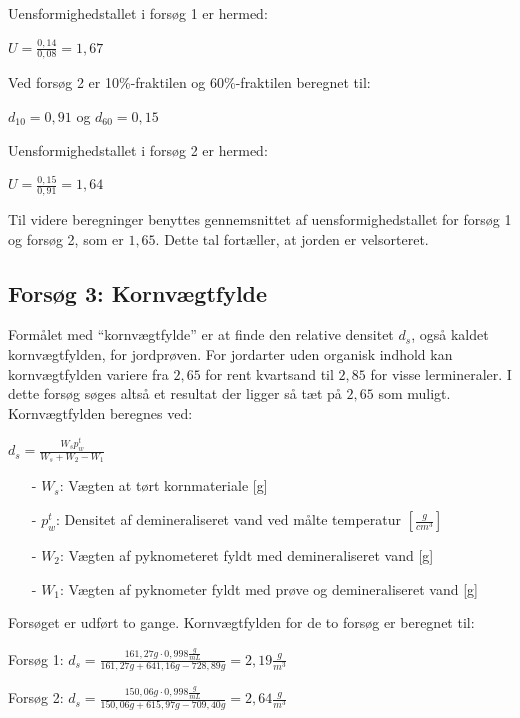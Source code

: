 Uensformighedstallet i forsøg 1 er hermed:
\begin{center}
	$U = \frac{0,\!14}{0,\!08} = 1,\!67$
\end{center}

Ved forsøg 2 er 10\%-fraktilen og 60\%-fraktilen beregnet til:
\begin{center}
	$d_{10} = 0,\!91$ og $d_{60} = 0,\!15$
\end{center} 

Uensformighedstallet i forsøg 2 er hermed:
\begin{center}
	$U = \frac{0,\!15}{0,\!91} = 1,\!64$
\end{center}

Til videre beregninger benyttes gennemsnittet af uensformighedstallet for forsøg 1 og forsøg 2, som er $1,\!65$. Dette tal fortæller, at jorden er velsorteret. 

\subsection{Forsøg 3: Kornvægtfylde}
Formålet med “kornvægtfylde” er at finde den relative densitet $d_s$, også kaldet kornvægtfylden, for jordprøven. For jordarter uden organisk indhold kan kornvægtfylden variere fra $2,\!65$ for rent kvartsand til $2,\!85$ for visse lermineraler. I dette forsøg søges altså et resultat der ligger så tæt på $2,\!65$ som muligt.
\newline
\newline
Kornvægtfylden beregnes ved:

\begin{center}
	$d_s = \frac{W_s p_w^t}{W_s + W_2 - W_1}$
\end{center}

\begin{itemize}
	\item[-] $W_s$: Vægten at tørt kornmateriale [g]
	\item[-] $p_w^t$: Densitet af demineraliseret vand ved målte temperatur $[\frac{g}{cm^3}]$
	\item[-] $W_2$: Vægten af pyknometeret fyldt med demineraliseret vand [g]
	\item[-] $W_1$: Vægten af pyknometer fyldt med prøve og demineraliseret vand [g]
\end{itemize}

Forsøget er udført to gange. Kornvægtfylden for de to forsøg er beregnet til:

\begin{center}
	Forsøg 1: $d_{s} = \frac{161,\!27 g \cdot 0,\!998 \frac{g}{mL}}{161,\!27 g + 641,\!16 g - 728,\!89 g} = 2,\!19 \frac{g}{m^3}$
\end{center}
\begin{center}
	Forsøg 2: $d_{s} = \frac{150,\!06 g \cdot 0,\!998 \frac{g}{mL}}{150,\!06 g + 615,\!97 g - 709,\!40 g} = 2,\!64 \frac{g}{m^3}$
\end{center} 

